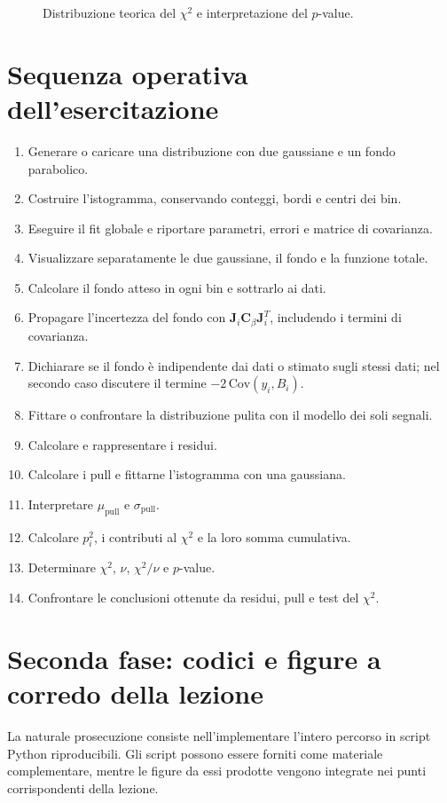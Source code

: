 \documentclass[11pt,a4paper]{book}
\begin{document}
\begin{figure}[htbp]
  \centering
  \caption{Distribuzione teorica del $\chi^2$ e interpretazione del $p$-value.}
  \label{fig:pvalue}
\end{figure}

\section{Sequenza operativa dell'esercitazione}
\begin{enumerate}[label=\arabic*.]
 \item Generare o caricare una distribuzione con due gaussiane e un fondo parabolico.
 \item Costruire l'istogramma, conservando conteggi, bordi e centri dei bin.
 \item Eseguire il fit globale e riportare parametri, errori e matrice di covarianza.
 \item Visualizzare separatamente le due gaussiane, il fondo e la funzione totale.
 \item Calcolare il fondo atteso in ogni bin e sottrarlo ai dati.
 \item Propagare l'incertezza del fondo con $\mathbf J_i\mathbf C_{\beta}\mathbf J_i^T$, includendo i termini di covarianza.
 \item Dichiarare se il fondo è indipendente dai dati o stimato sugli stessi dati; nel secondo caso discutere il termine $-2\,\mathrm{Cov}(y_i,B_i)$.
 \item Fittare o confrontare la distribuzione pulita con il modello dei soli segnali.
 \item Calcolare e rappresentare i residui.
 \item Calcolare i pull e fittarne l'istogramma con una gaussiana.
 \item Interpretare $\mu_{\mathrm{pull}}$ e $\sigma_{\mathrm{pull}}$.
 \item Calcolare $p_i^2$, i contributi al $\chi^2$ e la loro somma cumulativa.
 \item Determinare $\chi^2$, $\nu$, $\chi^2/\nu$ e $p$-value.
 \item Confrontare le conclusioni ottenute da residui, pull e test del $\chi^2$.
\end{enumerate}

\section{Seconda fase: codici e figure a corredo della lezione}
La naturale prosecuzione consiste nell'implementare l'intero percorso in script Python riproducibili. Gli script possono essere forniti come materiale complementare, mentre le figure da essi prodotte vengono integrate nei punti corrispondenti della lezione.
\end{document}
